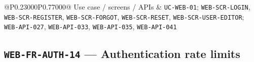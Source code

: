 \begin{longtable}{@{}P{0.23000\SRSWidth}P{0.77000\SRSWidth}@{}}
Use case /\allowbreak{} screens /\allowbreak{} APIs & \texttt{UC-\allowbreak{}WEB-\allowbreak{}01}; \texttt{WEB-\allowbreak{}SCR-\allowbreak{}LOGIN}, \texttt{WEB-\allowbreak{}SCR-\allowbreak{}REGISTER\allowbreak{}}, \texttt{WEB-\allowbreak{}SCR-\allowbreak{}FORGOT}, \texttt{WEB-\allowbreak{}SCR-\allowbreak{}RESET}, \texttt{WEB-\allowbreak{}SCR-\allowbreak{}USER-\allowbreak{}EDITOR}; \texttt{WEB-\allowbreak{}API-\allowbreak{}027}, \texttt{WEB-\allowbreak{}API-\allowbreak{}033}, \texttt{WEB-\allowbreak{}API-\allowbreak{}035}, \texttt{WEB-\allowbreak{}API-\allowbreak{}041} \\[3pt]
\end{longtable}
\endgroup

\subsection{\texttt{WEB-\allowbreak{}FR-\allowbreak{}AUTH-\allowbreak{}14} — Authentication rate limits}
\begingroup
\fontsize{9.5}{12}\selectfont
\setlength{\SRSWidth}{\dimexpr\linewidth-2\tabcolsep\relax}
